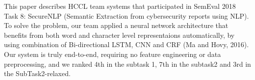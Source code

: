 This paper describes HCCL team systems that participated in SemEval 2018 Task 8: SecureNLP (Semantic Extraction from cybersecurity reports using NLP). To solve the problem, our team applied a neural network architecture that benefits from both word and character level representaions automatically, by using combination of Bi-directional LSTM, CNN and CRF (Ma and Hovy, 2016). Our system is truly end-to-end, requiring no feature engineering or data preprocessing, and we ranked 4th in the subtask 1, 7th in the subtask2 and 3rd in the SubTask2-relaxed.

